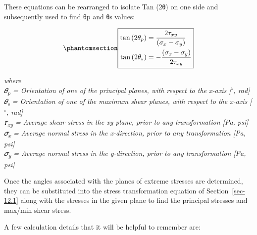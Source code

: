 \documentclass[
  letterpaper,
  DIV=11,
  numbers=noendperiod]{scrreprt}
\theoremstyle{definition}
\theoremstyle{remark}
\begin{document}
These equations can be rearranged to isolate Tan (2θ) on one side and
subsequently used to find θp and θs values:

\begin{equation}\phantomsection\label{eq-12.2}{
\boxed{\begin{aligned}
\tan \left(2 \theta_p\right) & =\frac{2 \tau_{x y}}{\left(\sigma_x-\sigma_y\right)} \\
\tan \left(2 \theta_s\right) & =-\frac{\left(\sigma_x-\sigma_y\right)}{2 \tau_{x y}}
\end{aligned}}
}\end{equation}

\emph{where}\\
\emph{𝜃\textsubscript{p} = Orientation of one of the principal planes,
with respect to the x-axis {[}}\(^\circ\)\emph{, rad{]}}\\
\emph{𝜃\textsubscript{s} = Orientation of one of the maximum shear
planes, with respect to the x-axis {[}}\(^\circ\)\emph{, rad{]}}\\
\emph{𝜏\textsubscript{xy} = Average shear stress in the xy plane, prior
to any transformation {[}Pa, psi{]}}\\
\emph{𝜎\textsubscript{x} = Average normal stress in the x-direction,
prior to any transformation {[}Pa, psi{]}}\\
\emph{𝜎\textsubscript{y} = Average normal stress in the y-direction,
prior to any transformation {[}Pa, psi{]}}

Once the angles associated with the planes of extreme stresses are
determined, they can be substituted into the stress transformation
equation of Section~\ref{sec-12.1} along with the stresses in the given
plane to find the principal stresses and max/min shear stress.

A few calculation details that it will be helpful to remember are:
\end{document}

